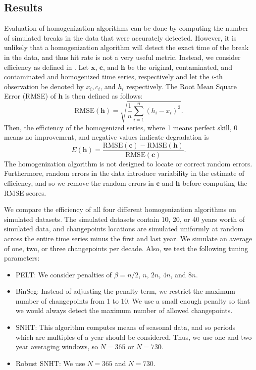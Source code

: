 \documentclass[12pt]{article}
\begin{document}
\begin{doublespacing}
\subsection{Results}

\label{sec:HomResults}

Evaluation of homogenization algorithms can be done by computing the number of simulated breaks in the data that were accurately detected.  However, it is unlikely that a homogenization algorithm will detect the exact time of the break in the data, and thus hit rate is not a very useful metric.  Instead, we consider efficiency as defined in \cite{domonkos13}.  Let $\mathbf{x}$, $\mathbf{c}$, and $\mathbf{h}$ be the original, contaminated, and contaminated and homogenized time series, respectively and let the $i$-th observation be denoted by $x_i, c_i$, and $h_i$ respectively.  The Root Mean Square Error (RMSE) of $\mathbf{h}$ is then defined as follows:
\begin{equation*}
	\mbox{RMSE}(\mathbf{h}) = \sqrt{\frac{1}{n} \sum_{i=1}^n (h_i-x_i)^2}.
\end{equation*}
Then, the efficiency of the homogenized series, where 1 means perfect skill, 0 means no improvement, and negative values indicate degradation is
\begin{equation*}
	E(\mathbf{h}) = \frac{\mbox{RMSE}(\mathbf{c})-\mbox{RMSE}(\mathbf{h})}{\mbox{RMSE}(\mathbf{c})}.
\end{equation*}
The homogenization algorithm is not designed to locate or correct random errors.  Furthermore, random errors in the data introduce variability in the estimate of efficiency, and so we remove the random errors in $\mathbf{c}$ and $\mathbf{h}$ before computing the RMSE scores.  

We compare the efficiency of all four different homogenization algorithms on simulated datasets.  The simulated datasets contain 10, 20, or 40 years worth of simulated data, and changepoints locations are simulated uniformly at random across the entire time series minus the first and last year.  We simulate an average of one, two, or three changepoints per decade.  Also, we test the following tuning parameters:

\begin{itemize}
	\item PELT: We consider penalties of $\beta=n/2$, $n$, $2n$, $4n$, and  $8n$.
	\item BinSeg: Instead of adjusting the penalty term, we restrict the maximum number of changepoints from 1 to 10.  We use a small enough penalty so that we would always detect the maximum number of allowed changepoints.
	\item SNHT: This algorithm computes means of seasonal data, and so periods which are multiples of a year should be considered.  Thus, we use one and two year averaging windows, so $N=365$ or $N=730$.
	\item Robust SNHT: We  use $N=365$ and $N= 730$.
\end{itemize}


\end{doublespacing}
\end{document}
